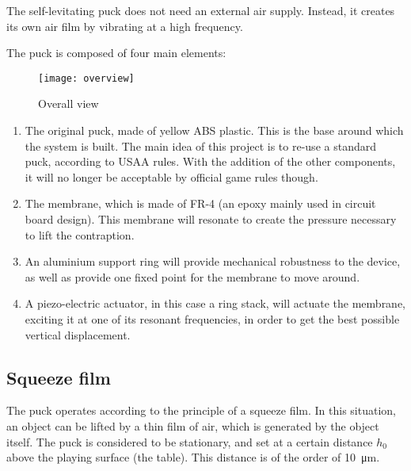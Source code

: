 
The self-levitating puck does not need an external air supply. Instead, it
creates its own air film by vibrating at a high frequency.

The puck is composed of four main elements:

\begin{figure}[h]
  \begin{center}
    \texttt{[image: overview]}
  \end{center}
  \caption{Overall view}
  \label{fig:overview}
\end{figure}

\begin{enumerate}[A]
  \item The original puck, made of yellow ABS plastic. This is the base around
    which the system is built. The main idea of this project is to re-use a
    standard puck, according to USAA rules. With the addition of the other
    components, it will no longer be acceptable by official game rules though.
  \item The membrane, which is made of FR-4 (an epoxy mainly used in circuit
    board design). This membrane will resonate to create the pressure necessary
    to lift the contraption.
  \item An aluminium support ring will provide mechanical robustness to the
    device, as well as provide one fixed point for the membrane to move around.
  \item A piezo-electric actuator, in this case a ring stack, will actuate
    the membrane, exciting it at one of its resonant frequencies, in order to
    get the best possible vertical displacement.
\end{enumerate}


\subsection{Squeeze film}

The puck operates according to the principle of a squeeze film. In this
situation, an object can be lifted by a thin film of air, which is generated by
the object itself. The puck is considered to be stationary, and set at a certain
distance $h_0$ above the playing surface (the table). This distance is of the
order of \SI{10}{\micro\metre}.

